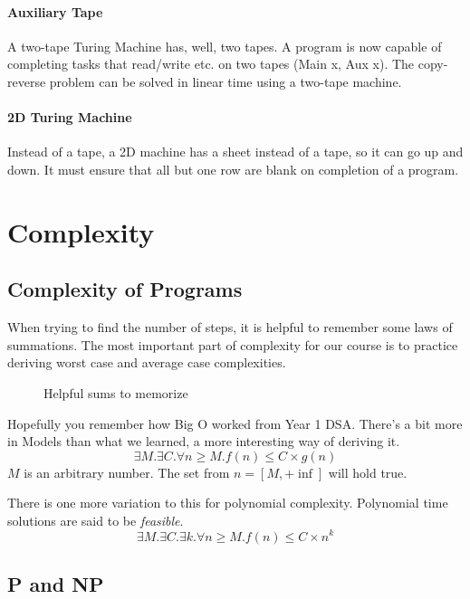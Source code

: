 \paragraph{Auxiliary Tape} A two-tape Turing Machine has, well, two tapes. A program is now capable of completing tasks that read/write etc. on two tapes (Main x, Aux x). The copy-reverse problem can be solved in linear time using a two-tape machine. 
\paragraph{2D Turing Machine} Instead of a tape, a 2D machine has a sheet instead of a tape, so it can go up and down. It must ensure that all but one row are blank on completion of a program.
\section{Complexity}
\subsection{Complexity of Programs}
When trying to find the number of steps, it is helpful to remember some laws of summations. The most important part of complexity for our course is to practice deriving worst case and average case complexities.
\begin{figure}[!htb]
	\caption{\label{fig:sum} Helpful sums to memorize}
\end{figure}
Hopefully you remember how Big O worked from Year 1 DSA. There's a bit more in Models than what we learned, a more interesting way of deriving it. \[\exists M. \exists C. \forall n \geq M. f(n) \leq C \times g(n)\]
$M$ is an arbitrary number. The set from $n = [M, +\inf]$ will hold true.

There is one more variation to this for polynomial complexity. Polynomial time solutions are said to be \textit{feasible}. 
\[\exists M. \exists C. \exists k. \forall n \geq M. f(n) \leq C \times n^k\]
\subsection{P and NP}
